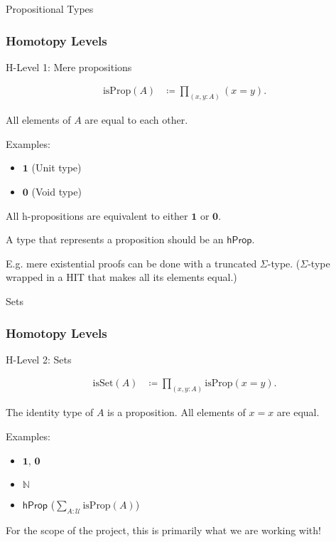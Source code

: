 \documentclass[9pt]{beamer}
\begin{document}
\begin{frame}{Propositional Types}
\frametitle{Homotopy Levels}

H-Level 1: Mere propositions

\begin{align*}
  \text{isProp}(A) & \coloneqq \prod_{(x,y:A)} (x = y).
\end{align*}

All elements of $A$ are equal to each other.

Examples:
\begin{itemize}
  \item $\mathbf{1}$ (Unit type)
  \item $\mathbf{0}$ (Void type)
\end{itemize}

All h-propositions are equivalent to either $\mathbf{1}$ or $\mathbf{0}$.

A type that represents a proposition should be an $\mathsf{hProp}$.

E.g. mere existential proofs can be done with a truncated $\Sigma$-type.
($\Sigma$-type wrapped in a HIT that makes all its elements equal.)

\end{frame}

\begin{frame}{Sets}
\frametitle{Homotopy Levels}

H-Level 2: Sets

\begin{align*}
  \text{isSet}(A) & \coloneqq \prod_{(x,y:A)} \text{isProp}(x = y).
\end{align*}

The identity type of $A$ is a proposition.
All elements of $x = x$ are equal.

Examples:
\begin{itemize}
  \item $\mathbf{1}$, $\mathbf{0}$
  \item $\mathbb{N}$
  \item $\mathsf{hProp}$ ($\sum_{A : \mathcal{U}} \text{isProp}(A)$)
\end{itemize}

For the scope of the project, this is primarily what we are working with!

\end{frame}
\end{document}
